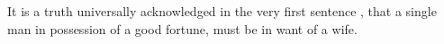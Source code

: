 \documentclass[a4paper,12pt]{article}
\begin{document}
\noindent
It is a truth universally acknowledged%
in the very first sentence , that a single man in possession of a good fortune,
must be in want of a wife.
\end{document}

